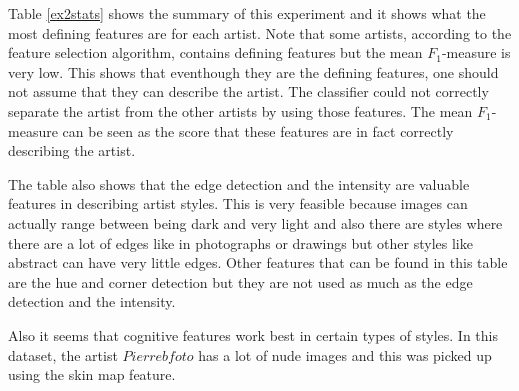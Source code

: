 Table \ref{ex2stats} shows the summary of this experiment and it shows what the most defining features are for each artist.
Note that some artists, according to the feature selection algorithm, contains defining features but the mean $F_1$-measure is very low.
This shows that eventhough they are the defining features, one should not assume that they can describe the artist.
The classifier could not correctly separate the artist from the other artists by using those features.
The mean $F_1$-measure can be seen as the score that these features are in fact correctly describing the artist.

The table also shows that the edge detection and the intensity are valuable features in describing artist styles.
This is very feasible because images can actually range between being dark and very light and also there are styles where there are a lot of edges like in photographs or drawings but other styles like abstract can have very little edges.
Other features that can be found in this table are the hue and corner detection but they are not used as much as the edge detection and the intensity.

Also it seems that cognitive features work best in certain types of styles.
In this dataset, the artist $Pierrebfoto$ has a lot of nude images and this was picked up using the skin map feature.





